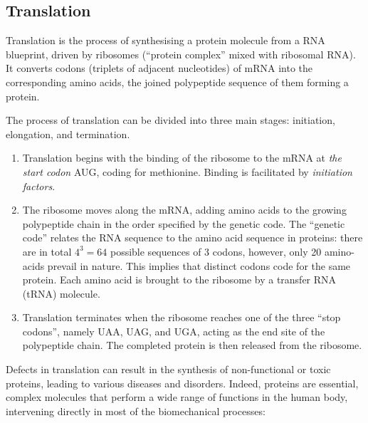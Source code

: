 \subsection{Translation}
Translation is the process of synthesising a protein molecule from a RNA blueprint, driven by ribosomes (\enquote{protein complex} mixed with ribosomal RNA). It converts codons (triplets of adjacent nucleotides) of mRNA into the corresponding amino acids, the joined polypeptide sequence of them forming a protein.  

The process of translation can be divided into three main stages: initiation, elongation, and termination.
\begin{enumerate}
    \item Translation begins with the binding of the ribosome to the mRNA at \emph{the start codon} AUG, coding for methionine. Binding is facilitated by \emph{initiation factors}.
    \item The ribosome moves along the mRNA, adding amino acids to the growing polypeptide chain in the order specified by the genetic code. The \enquote{genetic code} relates the RNA sequence to the amino acid sequence in proteins: there are in total $4^3=64$ possible sequences of 3 codons, however, only 20 amino-acids prevail in nature. This implies that distinct codons code for the same protein. Each amino acid is brought to the ribosome by a transfer RNA (tRNA) molecule.
    \item Translation terminates when the ribosome reaches one of the three \enquote{stop codons}, namely UAA, UAG, and UGA, acting as the end site of the polypeptide chain. The completed protein is then released from the ribosome.
\end{enumerate}

Defects in translation can result in the synthesis of non-functional or toxic proteins, leading to various diseases and disorders. Indeed, proteins are essential, complex molecules that perform a wide range of functions in the human body, intervening directly in most of the biomechanical processes: 

